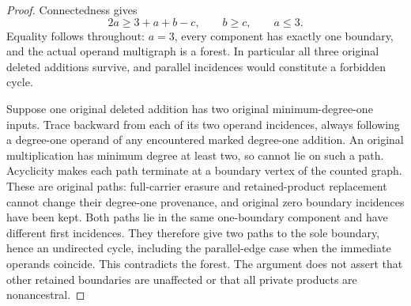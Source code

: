 \documentclass[11pt]{article}
\theoremstyle{definition}
\theoremstyle{remark}
\begin{document}
\begin{proof}
Connectedness gives
\[
                 2a\ge3+a+b-c,\qquad b\ge c,\qquad a\le3.
\]
Equality follows throughout: $a=3$, every component has exactly one boundary, and the actual operand multigraph is a forest. In particular all three original deleted additions survive, and parallel incidences would constitute a forbidden cycle.

Suppose one original deleted addition has two original minimum-degree-one inputs. Trace backward from each of its two operand incidences, always following a degree-one operand of any encountered marked degree-one addition. An original multiplication has minimum degree at least two, so cannot lie on such a path. Acyclicity makes each path terminate at a boundary vertex of the counted graph. These are original paths: full-carrier erasure and retained-product replacement cannot change their degree-one provenance, and original zero boundary incidences have been kept. Both paths lie in the same one-boundary component and have different first incidences. They therefore give two paths to the sole boundary, hence an undirected cycle, including the parallel-edge case when the immediate operands coincide. This contradicts the forest. The argument does not assert that other retained boundaries are unaffected or that all private products are nonancestral.
\end{proof}
\end{document}
